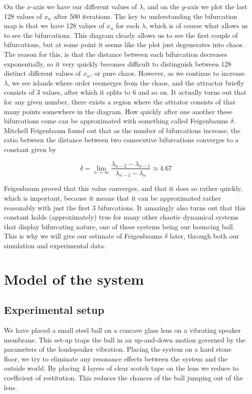\documentclass[12pt,oneside,a4paper]{article}
\numberwithin{equation}{section}
\begin{document}
{{{{On the $x$-axis we have our different values of $\lambda$, and on the $y$-axis we plot the last 128 values of $x_n$ after 500 iterations. The key to understanding the bifurcation map is that we have 128 values of $x_n$ for each $\lambda$, which is of course what allows us to see the bifurcations. This diagram clearly allows us to see the first couple of bifurcations, but at some point it seems like the plot just degenerates into chaos. The reason for this, is that the distance between each bifurcation decreases exponentially, so it very quickly becomes difficult to distinguish between 128 distinct different values of $x_n$, or pure chaos. However, as we continue to increase $\lambda$, we see islands where order reemerges from the chaos, and the attractor briefly consists of 3 values, after which it splits to 6 and so on. It actually turns out that for any given number, there exists a region where the attrator consists of that many points somewhere in the diagram. How quickly after one another these bifurcations come can be approximated with something called Feigenbaums $\delta$. Mitchell Feigenbaum found out that as the number of bifurcations increase, the ratio between the distance between two consecutive bifurcations converges to a constant given by

\begin{equation}
\delta=\lim_{n \to \infty} \frac{\lambda_{n-2} - \lambda_{n-1}}{\lambda_{n-1}-\lambda_n} \approx 4.67 \label{Feigenbaumsdelta}
\end{equation}

Feigenbaum proved that this value converges, and that it does so rather quickly, which is important, because it means that it can be approximated rather reasonably with just the first 3 bifurcations. It amazingly also turns out that this constant holds (approximately) true for many other chaotic dynamical systems that display bifurcating nature, one of these systems being our bouncing ball. This is why we will give our estimate of Feigenbaums $\delta$ later, through both our simulation and experimental data.



\section{Model of the system}
\label{modelling}
\subsection{Experimental setup}
We have placed a small steel ball on a concave glass lens on a vibrating 
speaker membrane. This set-up traps the ball in an up-and-down motion governed 
by the parameters of the loudspeaker vibration. Placing the system on a hard 
stone floor, we try to eliminate any resonance effects between the system and 
the outside world. By placing 4 layers of clear scotch tape on the lens we 
reduce to coefficient of restitution. This reduces the chances of the ball 
jumping out of the lens. 
}}}}
\end{document}
